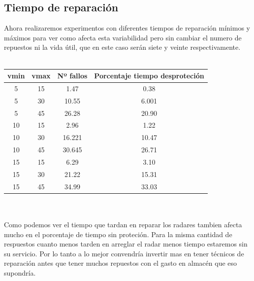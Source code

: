 \documentclass[12pt,a4paper]{article}
\begin{document}
\subsection{Tiempo de reparación}
Ahora realizaremos experimentos con diferentes tiempos de reparación mínimos y máximos para ver como afecta esta variabilidad pero sin cambiar el numero de repuestos ni la vida útil, que en este caso serán siete y veinte respectivamente.\\\\
\begin{tabular}{|c|c|c|c|}
	\hline 
	vmin & vmax & Nº fallos &Porcentaje tiempo desproteción \\ 
	\hline 	
	5 &15 & 1.47  & 0.38 \\
	5 &30 & 10.55  & 6.001 \\
	5 &45 & 26.28  & 20.90 \\ 
		\hline 		\hline 	   
	10 &15 & 2.96  & 1.22 \\ 
	10 &30 & 16.221  & 10.47 \\ 
	10 &45 & 30.645  & 26.71 \\ 
	\hline
	\hline 	   
	15 &15 & 6.29  & 3.10 \\ 
	15 &30 & 21.22  & 15.31 \\ 
	15 &45 & 34.99  & 33.03 \\ 
	\hline  
\end{tabular} 
\\\\
Como podemos ver el tiempo  que tardan en reparar los radares tambien afecta mucho en el porcentaje de tiempo sin proteción. Para la misma cantidad de respuestos cuanto menos tarden en arreglar el radar menos tiempo estaremos sin su servicio. Por lo tanto a lo mejor convendría invertir mas en tener técnicos de reparación antes que tener muchos repuestos con el gasto en almacén que eso supondría. 
\end{document}
